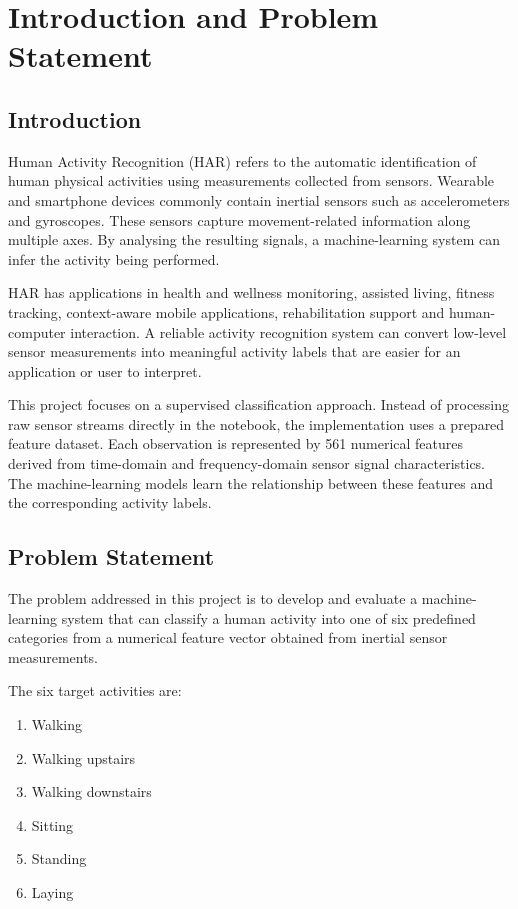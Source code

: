 \chapter{Introduction and Problem Statement}
\section{Introduction}
Human Activity Recognition (HAR) refers to the automatic identification of human physical activities using measurements collected from sensors. Wearable and smartphone devices commonly contain inertial sensors such as accelerometers and gyroscopes. These sensors capture movement-related information along multiple axes. By analysing the resulting signals, a machine-learning system can infer the activity being performed.

HAR has applications in health and wellness monitoring, assisted living, fitness tracking, context-aware mobile applications, rehabilitation support and human-computer interaction. A reliable activity recognition system can convert low-level sensor measurements into meaningful activity labels that are easier for an application or user to interpret.

This project focuses on a supervised classification approach. Instead of processing raw sensor streams directly in the notebook, the implementation uses a prepared feature dataset. Each observation is represented by 561 numerical features derived from time-domain and frequency-domain sensor signal characteristics. The machine-learning models learn the relationship between these features and the corresponding activity labels.

\section{Problem Statement}
The problem addressed in this project is to develop and evaluate a machine-learning system that can classify a human activity into one of six predefined categories from a numerical feature vector obtained from inertial sensor measurements.

The six target activities are:
\begin{enumerate}[label=\arabic*.]
\item Walking
\item Walking upstairs
\item Walking downstairs
\item Sitting
\item Standing
\item Laying
\end{enumerate}

